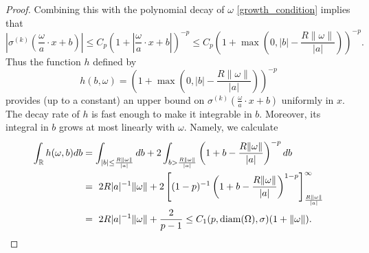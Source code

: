 \begin{proof}
Combining this with the polynomial decay of $\omega$ \eqref{growth_condition} implies that
\begin{equation}\label{eq_779}
  \left|\sigma^{(k)}\left(\frac{\omega}{a}\cdot x+b\right)\right| \leq C_p\left(1 + \left|\frac{\omega}{a}\cdot x+b\right|\right)^{-p} \leq C_p\left(1 + \max\left(0,|b| - \frac{R\|\omega\|}{|a|}\right)\right)^{-p}.
\end{equation}
Thus the function $h$ defined by 
 \begin{equation}\label{h_definition}
  h(b,\omega) = \left(1 + \max\left(0,|b| - \frac{R\|\omega\|}{|a|}\right)\right)^{-p}
 \end{equation}
 provides (up to a constant) an upper bound on
 $\sigma^{(k)}\left(\frac{\omega}{a}\cdot x+b\right)$ uniformly in
 $x$.  The decay rate of $h$ is fast enough to make it integrable in
 $b$. Moreover, its integral in $b$ grows at most linearly with
 $\omega$. Namely, we calculate
 \begin{equation}\label{eq_775}
 \begin{split}
  \int_\mathbb{R} h(\omega,b)db& = \int_{|b|\leq \frac{R\|\omega\|}{|a|}} db + 2\int_{b > \frac{R\|\omega\|}{|a|}} \left(1 + b - \frac{R\|\omega\|}{|a|}\right)^{-p}db \\
  & =~2R|a|^{-1}\|\omega\| + 2\left[(1-p)^{-1}\left(1 + b - \frac{R\|\omega\|}{|a|}\right)^{1-p}\right]_{\frac{R\|\omega\|}{|a|}}^\infty \\
  &=~2R|a|^{-1}\|\omega\| + \frac{2}{p-1}\leq C_1(p,\text{\normalfont diam}(\Omega),\sigma) (1 + \|\omega\|).
  \end{split}
 \end{equation}
\end{proof}

